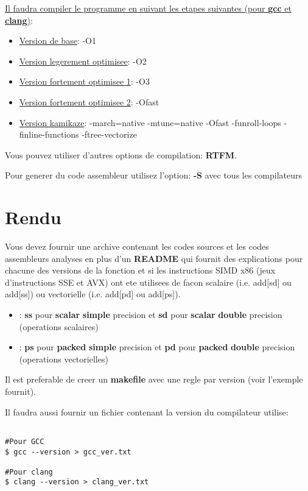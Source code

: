 \documentclass[11pt]{article}
\begin{document}
\uline{Il faudra compiler le programme en suivant les etapes suivantes (pour \textbf{gcc} et \textbf{clang})}:

\begin{itemize}
\item \uline{Version de base}: -O1
\item \uline{Version legerement optimisee}: -O2
\item \uline{Version fortement optimisee 1}: -O3
\item \uline{Version fortement optimisee 2}: -Ofast
\item \uline{Version kamikaze}: -march=native -mtune=native -Ofast -funroll-loops -finline-functions -ftree-vectorize
\end{itemize}

Vous pouvez utiliser d'autres options de compilation: \textbf{RTFM}.

Pour generer du code assembleur utilisez l'option: \textbf{-S} avec tous les compilateurs

\section{Rendu}
\label{sec:orgc8d855a}

Vous devez fournir une archive contenant les codes sources et les codes assembleurs analyses en plus d'un \textbf{README} qui fournit
des explications pour chacune des versions de la fonction et si les instructions SIMD x86 (jeux d'instructions SSE et AVX) ont ete 
utilisees de facon scalaire (i.e. add[sd] ou add[ss]) ou vectorielle (i.e. add[pd] ou add[ps]).

\begin{itemize}
\item\relax [ss | sd]: \textbf{ss} pour \textbf{scalar} \textbf{simple} precision et \textbf{sd} pour \textbf{scalar} \textbf{double} precision (operations scalaires)
\item\relax [ps | pd]: \textbf{ps} pour \textbf{packed} \textbf{simple} precision et \textbf{pd} pour \textbf{packed} \textbf{double} precision (operations vectorielles)
\end{itemize}

Il est preferable de creer un \textbf{makefile} avec une regle par version (voir l'exemple fournit).

Il faudra aussi fournir un fichier contenant la version du compilateur utilise:

\begin{verbatim}

#Pour GCC
$ gcc --version > gcc_ver.txt

#Pour clang
$ clang --version > clang_ver.txt

\end{verbatim}
\end{document}
